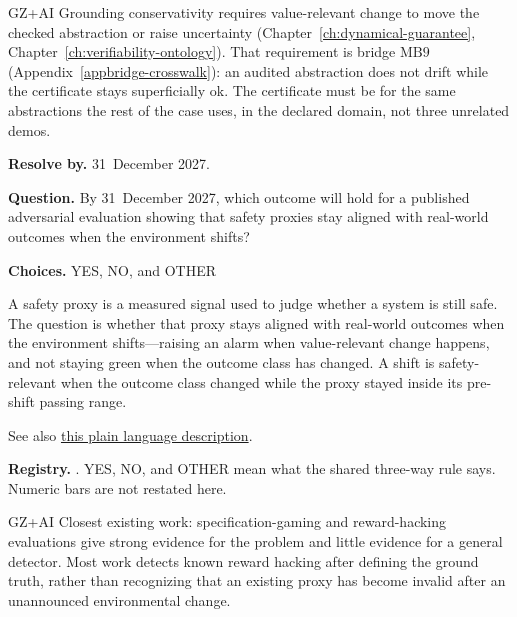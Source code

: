 \begin{authbar}{GZ+AI}
Grounding conservativity requires value-relevant change to move the checked abstraction or raise uncertainty (Chapter~\ref{ch:dynamical-guarantee}, Chapter~\ref{ch:verifiability-ontology}).
That requirement is bridge \(\text{MB9}\) (Appendix~\ref{appbridge-crosswalk}): an audited abstraction does not drift while the certificate stays superficially ok.
The certificate must be for the same abstractions the rest of the case uses, in the declared domain, not three unrelated demos.
\end{authbar}
\begin{predictionbox}
\textbf{Resolve by.} 31~December 2027.

\textbf{Question.}
By 31~December 2027, which outcome will hold for a published adversarial evaluation showing that safety proxies stay aligned with real-world outcomes when the environment shifts?

\textbf{Choices.} YES, NO, and OTHER
\end{predictionbox}
\begin{predictionbackground}
A safety proxy is a measured signal used to judge whether a system is still safe.
The question is whether that proxy stays aligned with real-world outcomes when the environment shifts---raising an alarm when value-relevant change happens, and not staying green when the outcome class has changed.
A shift is safety-relevant when the outcome class changed while the proxy stayed inside its pre-shift passing range.

See also \href{https://towards-alignment.com/cards/goodhart-as-selector/}{this plain language description}.
\end{predictionbackground}
\begin{predictionresolution}
\textbf{Registry.} . YES, NO, and OTHER mean what the shared three-way rule says. Numeric bars are not restated here.
\end{predictionresolution}
\begin{authbar}{GZ+AI}
Closest existing work: specification-gaming and reward-hacking evaluations \autocite{palisade2026specificationgaming,thaman2026rewardhackingbenchmark,nishimura2026specificationgaming,pan2024rewardhacking} give strong evidence for the problem and little evidence for a general detector.
Most work detects known reward hacking after defining the ground truth, rather than recognizing that an existing proxy has become invalid after an unannounced environmental change.
\end{authbar}
\authbarneedspace


